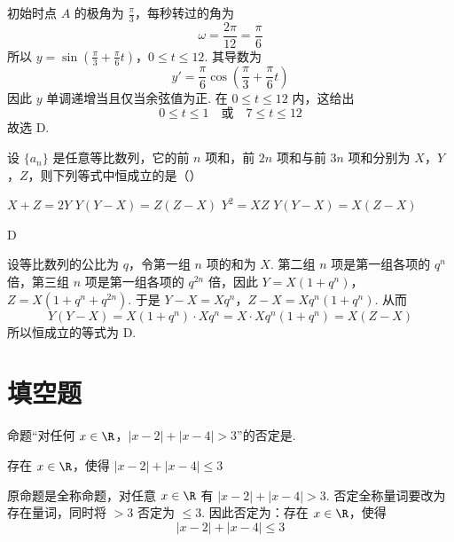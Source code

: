 \begin{solution}
初始时点 \(A\) 的极角为 \(\frac{\pi}{3}\)，每秒转过的角为
\[
\omega=\frac{2\pi}{12}=\frac{\pi}{6}
\]
所以
\(y=\sin\left(\frac{\pi}{3}+\frac{\pi}{6}t\right)\)，\(0\leqslant t\leqslant12\).
其导数为
\[
y'=\frac{\pi}{6}\cos\left(\frac{\pi}{3}+\frac{\pi}{6}t\right)
\]
因此 \(y\) 单调递增当且仅当余弦值为正. 在 \(0\leqslant t\leqslant12\) 内，这给出
\[
0\leqslant t\leqslant1\quad\text{或}\quad 7\leqslant t\leqslant12
\]
故选 D.
\end{solution}

\begin{problem}
设 \(\{a_{n}\}\) 是任意等比数列，它的前 \(n\) 项和，前 \(2n\) 项和与前 \(3n\) 项和分别为 \(X\)，\(Y\)，\(Z\)，则下列等式中恒成立的是（\quad）

\choices
    {\(X + Z = 2Y\)}
    {\(Y(Y - X) = Z(Z - X)\)}
    {\(Y^{2} = XZ\)}
    {\(Y(Y - X) = X(Z - X)\)}
\end{problem}

\begin{answer}
D
\end{answer}

\begin{solution}
设等比数列的公比为 \(q\)，令第一组 \(n\) 项的和为 \(X\). 第二组 \(n\) 项是第一组各项的 \(q^n\) 倍，第三组 \(n\) 项是第一组各项的 \(q^{2n}\) 倍，因此
\(Y=X(1+q^n)\)，\(Z=X(1+q^n+q^{2n})\).
于是
\(Y-X=Xq^n\)，\(Z-X=Xq^n(1+q^n)\).
从而
\[
Y(Y-X)=X(1+q^n)\cdot Xq^n
=X\cdot Xq^n(1+q^n)=X(Z-X)
\]
所以恒成立的等式为 D.
\end{solution}

\section{填空题}

\begin{problem}
命题“对任何 \(x \in \R\)，\(|x - 2| + |x - 4| > 3\)”的否定是\fillinblank{}.
\end{problem}

\begin{answer}
存在 \(x \in \R\)，使得 \(|x - 2| + |x - 4| \leqslant 3\)
\end{answer}

\begin{solution}
原命题是全称命题，对任意 \(x\in\R\) 有 \(|x-2|+|x-4|>3\). 否定全称量词要改为存在量词，同时将 \(>3\) 否定为 \(\leqslant3\). 因此否定为：存在 \(x\in\R\)，使得
\[
|x-2|+|x-4|\leqslant3
\]
\end{solution}

